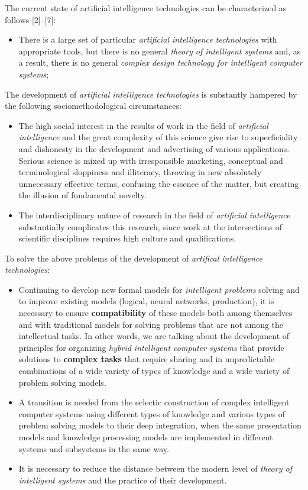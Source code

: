 \documentclass[10pt, a4paper]{proc}
\begin{document}
 The current state of artificial intelligence technologies can be characterized as follows [2]–[7]:
 \begin{itemize}
  \item There is a large set of particular \textit{artificial intelligence technologies} with appropriate tools, but there is no general \textit{theory of intelligent systems} and, as a result, there is no general \textit{complex design technology for intelligent computer systems};
 \end{itemize}
 The development of \textit{artificial intelligence technologies} is substantly hampered by the following sociomethodological circumstances:
 \begin{itemize}
  \item The high social interest in the results of work in the field of \textit{artificial intelligence} and the great complexity of this science give rise to superficiality and dishonesty in the development and advertising of various applications. Serious science is mixed up with irresponsible marketing, conceptual and terminological sloppiness and illiteracy, throwing in new absolutely unnecessary effective terms, confusing the essence of the matter, but creating the illusion of fundamental novelty.
  \item The interdisciplinary nature of research in the field of \textit{artificial intelligence} substantially complicates this research, since work at the intersections of scientific disciplines requires high culture and qualifications.
 \end{itemize}
 To solve the above problems of the development of \textit{artifical intelligence technologies}:
 \begin{itemize}
  \item  Continuing to develop new formal models for \textit{intelligent problems} solving and to improve existing models (logical, neural networks, production), it is necessary to ensure \textbf{compatibility} of these models both among themselves and with traditional models for solving problems that are not among the intellectual tasks. In other words, we are talking about the development of principles for organizing \textit{hybrid intelligent computer systems} that provide solutions to \textbf{complex tasks} that require sharing and in unpredictable combinations of a wide variety of types of knowledge and a wide variety of problem solving models.
  \item A transition is needed from the eclectic construction of complex intelligent computer systems using different types of knowledge and various types of problem solving models to their deep integration, when the same presentation models and knowledge processing models are implemented in different systems and subsystems in the same way.
  \item It is necessary to reduce the distance between the modern level of \textit{theory of intelligent systems}    and the practice of their development.
 \end{itemize}
\end{document}

